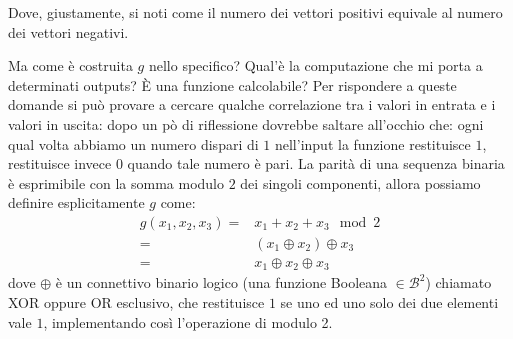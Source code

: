 \documentclass[12pt,a4paper,openright]{report}
\newcommand*\xor{\mathbin{\oplus}}
\begin{document}
\begin{center}
\end{center}
Dove, giustamente, si noti come il numero dei vettori positivi equivale al numero dei vettori negativi.\par
Ma come è costruita $g$ nello specifico? Qual'è la computazione che mi porta a determinati outputs? È una funzione calcolabile?
Per rispondere a queste domande si può provare a cercare qualche correlazione tra i valori in entrata e i valori in uscita:
dopo un pò di riflessione dovrebbe saltare all'occhio che: ogni qual volta abbiamo un numero dispari di $1$ nell'input la funzione 
restituisce $1$, restituisce invece $0$ quando tale numero è pari.
La parità di una sequenza binaria è esprimibile con la somma modulo $2$ dei singoli componenti, allora possiamo definire esplicitamente $g$ come:
\begin{align*}
    g(x_1, x_2, x_3)= &x_1 + x_2 + x_3 \mod 2  \\
                    = &(x_1 \xor x_2) \xor x_3  \\
                    = &x_1 \xor x_2 \xor x_3
\end{align*}
dove $\xor$ è un connettivo binario logico (una funzione Booleana $\in \mathcal{B}^2$) chiamato XOR oppure OR esclusivo, che restituisce $1$ se uno ed uno solo dei due 
elementi vale $1$, implementando così l'operazione di modulo 2. 
\end{document}
